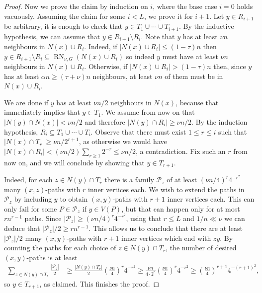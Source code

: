 \documentclass[a4paper, 11pt,reqno]{amsart}
\theoremstyle{plain}
\theoremstyle{definition}
\numberwithin{equation}{section}
\begin{document}
\begin{proof}
	Now we prove the claim by induction on $i$, where the base
        case $i=0$ holds vacuously.  Assuming the claim for some $i <
        L$, we prove it for $i+1$.  Let $y \in R_{i+1}$ be arbitrary,
        it is enough to check that $y \in T_1 \cup \dotsb \cup
        T_{i+1}$.  By the inductive hypothesis, we can assume that $y
        \in R_{i+1} \setminus R_i$.  Note that $y$ has at least $\nu
        n$ neighbours in $N(x) \cup R_i$.  Indeed, if $|N(x) \cup R_i|
        \leq (1 - \tau)n$ then $y \in R_{i+1} \setminus R_i \subseteq
        \operatorname{RN}_{\nu, G}(N(x) \cup R_i)$ so indeed $y$ must
        have at least $\nu n$ neighbours in $N(x) \cup R_i$.
        Otherwise, if $|N(x) \cup R_i| > (1 - \tau)n$ then, since $y$
        has at least $\alpha n \geq (\tau + \nu) n$ neighbours, at
        least $\nu n$ of them must be in $N(x) \cup R_i$.
	
	We are done if $y$ has at least $\nu n/2$ neighbours in
        $N(x)$, because that immediately implies that $y \in T_1$.  We
        assume from now on that $|N(y) \cap N(x)| < \nu n/2$ and
        therefore $|N(y) \cap R_i| \geq \nu n /2$.  By the induction
        hypothesis, $R_i \subseteq T_1 \cup \dotsb \cup T_i$.  Observe
        that there must exist $1 \leq r \leq i$ such that $|N(x) \cap
        T_r| \geq \nu n / 2^{r+1}$, as otherwise we would have $|N(x)
        \cap R_i| < (\nu n/2) \sum_{r\geq 1} 2^{-r} \leq \nu n / 2$, a
        contradiction.  Fix such an $r$ from now on, and we will
        conclude by showing that $y \in T_{r+1}$.
	
	Indeed, for each $z \in N(y) \cap T_r$ there is a family
        $\mathcal{P}_z$ of at least $(\nu n/4)^r 4^{-r^2}$ many $(x,
        z)$-paths with $r$ inner vertices each.  We wish to extend the
        paths in $\mathcal{P}_z$ by including $y$ to obtain
        $(x,y)$-paths with $r+1$ inner vertices each.  This can only
        fail for some $P \in \mathcal{P}_z$ if $y \in V(P)$, but that
        can happen only for at most $rn^{r-1}$ paths.
        Since $|\mathcal{P}_z| \geq (\nu n/4)^r 4^{-r^2}$, using that $r \leq L$ and $1/n \ll \nu$ we can deduce that $|\mathcal{P}_z|/2 \geq rn^{r-1}$.
        This allows us to conclude that there are at least $|\mathcal{P}_z| / 2$ many
        $(x,y)$-paths with $r+1$ inner vertices which end with $zy$.
        By counting the paths for each choice of $z \in N(y) \cap
        T_r$, the number of desired $(x,y)$-paths is at least
	\begin{align*}
		\sum_{z \in N(y) \cap T_r} \frac{|\mathcal{P}_z|}{2} 
		& \geq \frac{|N(y) \cap T_r|}{2} \left( \frac{\nu n}{4} \right)^r 4^{-r^2} %
		 \geq \frac{\nu n}{4 \cdot 2^{r}} \left( \frac{\nu n}{4} \right)^r 4^{-r^2} %
		\geq \left( \frac{\nu n}{4} \right)^{r+1} 4^{-(r+1)^2},
	\end{align*}
	so $y \in T_{r+1}$, as claimed.
	This finishes the proof.
\end{proof}
\end{document}
